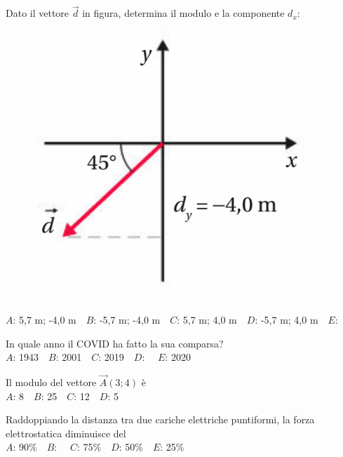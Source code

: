 \mcquestionheader Dato il vettore $\vec{d}$ in figura, determina il modulo e la componente $d_x$: \begin{figure}[h!]   \begin{center}     \includegraphics[scale=0.35]{vettored.png}   \end{center} \end{figure}\\
{$A$}: 5,7 m; -4,0 m\ \ {$B$}: -5,7 m; -4,0 m\ \ {$C$}: 5,7 m; 4,0 m\ \ {$D$}: -5,7 m; 4,0 m\ \ {$E$}: \ \ 

\mcquestionfooter



\def\mcquestionnumber{8}


\mcquestionheader In quale anno il COVID ha fatto la sua comparsa?\\
{$A$}: 1943\ \ {$B$}: 2001\ \ {$C$}: 2019\ \ {$D$}: \ \ {$E$}: 2020\ \ 

\mcquestionfooter



\def\mcquestionnumber{9}


\mcquestionheader Il modulo del vettore $\vec{A}(3;4)$ è\\
{$A$}: 8\ \ {$B$}: 25\ \ {$C$}: 12\ \ {$D$}: 5\ \ 

\mcquestionfooter



\def\mcquestionnumber{10}


\mcquestionheader Raddoppiando la distanza tra due cariche elettriche puntiformi, la forza elettrostatica diminuisce del\\
{$A$}: 90\%\ \ {$B$}: \ \ {$C$}: 75\%\ \ {$D$}: 50\%\ \ {$E$}: 25\%\ \ 

